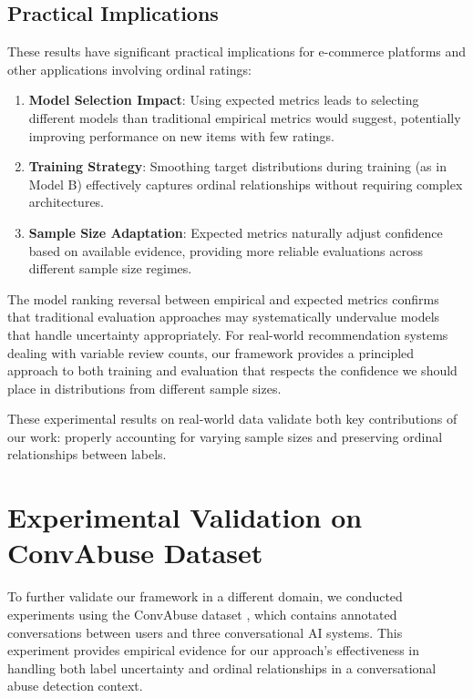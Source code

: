 \documentclass[journal]{IEEEtran}
\begin{document}
\subsection{Practical Implications}

These results have significant practical implications for e-commerce platforms and other applications involving ordinal ratings:

\begin{enumerate}
    \item \textbf{Model Selection Impact}: Using expected metrics leads to selecting different models than traditional empirical metrics would suggest, potentially improving performance on new items with few ratings.
    
    \item \textbf{Training Strategy}: Smoothing target distributions during training (as in Model B) effectively captures ordinal relationships without requiring complex architectures.
    
    \item \textbf{Sample Size Adaptation}: Expected metrics naturally adjust confidence based on available evidence, providing more reliable evaluations across different sample size regimes.
\end{enumerate}

The model ranking reversal between empirical and expected metrics confirms that traditional evaluation approaches may systematically undervalue models that handle uncertainty appropriately. For real-world recommendation systems dealing with variable review counts, our framework provides a principled approach to both training and evaluation that respects the confidence we should place in distributions from different sample sizes.

These experimental results on real-world data validate both key contributions of our work: properly accounting for varying sample sizes and preserving ordinal relationships between labels.


\section{Experimental Validation on ConvAbuse Dataset}

To further validate our framework in a different domain, we conducted experiments using the ConvAbuse dataset \cite{cercas2021}, which contains annotated conversations between users and three conversational AI systems. This experiment provides empirical evidence for our approach's effectiveness in handling both label uncertainty and ordinal relationships in a conversational abuse detection context.
\end{document}
